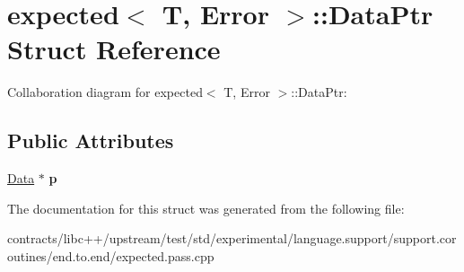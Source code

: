 \hypertarget{structexpected_1_1_data_ptr}{}\section{expected$<$ T, Error $>$\+:\+:Data\+Ptr Struct Reference}
\label{structexpected_1_1_data_ptr}


Collaboration diagram for expected$<$ T, Error $>$\+:\+:Data\+Ptr\+:
\subsection*{Public Attributes}
\begin{DoxyCompactItemize}
\item 
\mbox{\label{structexpected_1_1_data_ptr_aa4e1dd452059919109dd81ccd836e698}} 
\mbox{\hyperlink{structexpected_1_1_data}{Data}} $\ast$ {\bfseries p}
\end{DoxyCompactItemize}


The documentation for this struct was generated from the following file\+:\begin{DoxyCompactItemize}
\item 
contracts/libc++/upstream/test/std/experimental/language.\+support/support.\+coroutines/end.\+to.\+end/expected.\+pass.\+cpp\end{DoxyCompactItemize}
